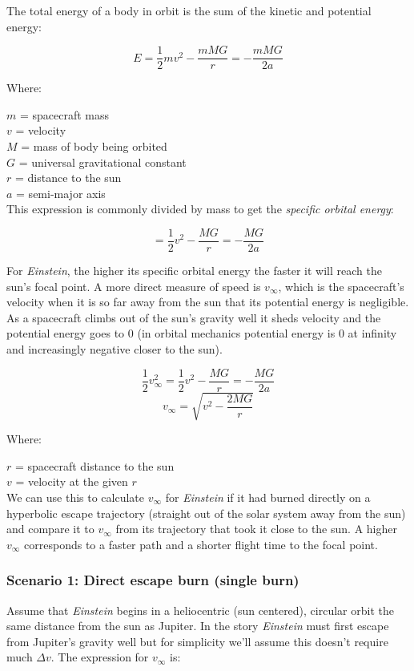 \documentclass[12pt]{article} %
\begin{document}
The total energy of a body in orbit is the sum of the kinetic and potential energy:

$$ E = \frac{1}{2} mv^2 - \frac{mMG}{r} = -\frac{mMG}{2a}$$

Where:

$m$ = spacecraft mass \\
$v$ = velocity \\
$M$ = mass of body being orbited\\
$G$ = universal gravitational constant\\
$r$ = distance to the sun\\
$a$ = semi-major axis\\

This expression is commonly divided by mass to get the \textit{specific orbital energy}:

$$ = \frac{1}{2} v^2 - \frac{MG}{r} = -\frac{MG}{2a}$$

For \textit{Einstein}, the higher its specific orbital energy the faster it will reach the sun's focal point. A more direct measure of speed is $v_{\infty}$, which is the spacecraft's velocity when it is so far away from the sun that its potential energy is negligible. As a spacecraft climbs out of the sun's gravity well it sheds velocity and the potential energy goes to 0 (in orbital mechanics potential energy is 0 at infinity and increasingly negative closer to the sun).

$$\frac{1}{2}v_{\infty}^{2} = \frac{1}{2} v^2 - \frac{MG}{r} = -\frac{MG}{2a}$$
$$v_{\infty} = \sqrt{v^2-\frac{2MG}{r}}$$

Where:

$r$ = spacecraft distance to the sun\\
$v$ = velocity at the given $r$\\

We can use this to calculate $v_{\infty}$ for \textit{Einstein} if it had burned directly on a hyperbolic escape trajectory (straight out of the solar system away from the sun) and compare it to $v_{\infty}$ from its trajectory that took it close to the sun. A higher $v_{\infty}$ corresponds to a faster path and a shorter flight time to the focal point.

\subsubsection{Scenario 1: Direct escape burn (single burn)}

Assume that \textit{Einstein} begins in a heliocentric (sun centered), circular orbit the same distance from the sun as Jupiter. In the story \textit{Einstein} must first escape from Jupiter's gravity well but for simplicity we'll assume this doesn't require much $\Delta v$. The expression for $v_{\infty}$ is:
\end{document}
